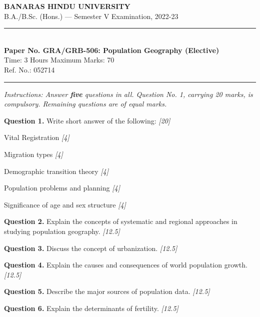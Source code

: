 \documentclass[11pt,a4paper]{article}
\newcommand{\pts}[1]{\hfill   \textit{[#1]}}
\begin{document}
\begin{center}
  {\large\bfseries BANARAS HINDU UNIVERSITY}\\[2pt]
  {\normalsize B.A./B.Sc. (Hons.) --- Semester V Examination, 2022-23}\\[6pt]
  \rule{0.8\linewidth}{0.5pt}\\[6pt]
  {\large\bfseries Paper No. GRA/GRB-506: Population Geography (Elective)}\\[4pt]
  {\normalsize Time: 3 Hours \hfill Maximum Marks: 70}\\[2pt]
  {\small Ref. No.: 052714}
\end{center}
\rule{\linewidth}{0.4pt}
\smallskip



\noindent   \textit{Instructions: Answer   \textbf{five} questions in all. Question No. 1, carrying 20 marks, is compulsory. Remaining questions are of equal marks.}
\bigskip




\noindent   \textbf{Question 1.} Write short answer of the following: \pts{20}

\begin{parts}
  \item Vital Registration \pts{4}
  \item Migration types \pts{4}
  \item Demographic transition theory \pts{4}
  \item Population problems and planning \pts{4}
  \item Significance of age and sex structure \pts{4}
\end{parts}

\medskip


\noindent   \textbf{Question 2.} Explain the concepts of systematic and regional approaches in studying population geography. \pts{12.5}

\medskip


\noindent   \textbf{Question 3.} Discuss the concept of urbanization. \pts{12.5}

\medskip


\noindent   \textbf{Question 4.} Explain the causes and consequences of world population growth. \pts{12.5}

\medskip


\noindent   \textbf{Question 5.} Describe the major sources of population data. \pts{12.5}

\medskip


\noindent   \textbf{Question 6.} Explain the determinants of fertility. \pts{12.5}
\end{document}
